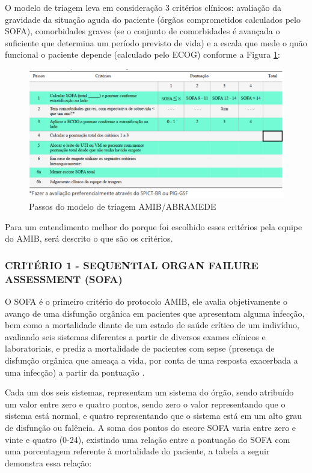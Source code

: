 \documentclass[12pt]{article}
\begin{document}
O modelo de triagem leva em consideração 3 critérios clínicos: avaliação da gravidade da situação aguda do paciente (órgãos comprometidos calculados pelo SOFA), comorbidades graves (se o conjunto de comorbidades é avançada o suficiente que determina um período previsto de vida) e a escala que mede o quão funcional o paciente depende (calculado pelo ECOG) conforme a Figura \ref{Passos-modelo-triagem-AMIB-ABRAMEDE}:

\begin{figure}[H]
    \centering
    \includegraphics[scale=0.5]{img/Tabela de pontuacoes e criterios.png}
    \centering
    \caption{Passos do modelo de triagem AMIB/ABRAMEDE \cite{kretzer2020recomendaccoes}}
    \label{Passos-modelo-triagem-AMIB-ABRAMEDE}
\end{figure}

Para um entendimento melhor do porque foi escolhido esses critérios pela equipe do AMIB, será descrito o que são os critérios.

\subsubsection{CRITÉRIO 1 - SEQUENTIAL ORGAN FAILURE ASSESSMENT (SOFA)}

O SOFA é o primeiro critério do protocolo AMIB, ele avalia objetivamente o avanço de uma disfunção orgânica em pacientes que apresentam alguma infecção, bem como a mortalidade diante de um estado de saúde crítico de um indivíduo, avaliando seis sistemas diferentes a partir de diversos exames clínicos e laboratoriais, e prediz a mortalidade de pacientes com sepse (presença de disfunção orgânica que ameaça a vida, por conta de uma resposta exacerbada a uma infecção) a partir da pontuação \cite{lambden2019sofa}.

Cada um dos seis sistemas, representam um sistema do órgão, sendo atribuído um valor entre zero e quatro pontos, sendo zero o valor representando que o sistema está normal, e quatro representando que o sistema está em um alto grau de disfunção ou falência. A soma dos pontos do escore SOFA varia entre zero e vinte e quatro (0-24), existindo uma relação entre a pontuação do SOFA com uma porcentagem referente à mortalidade do paciente, a tabela a seguir demonstra essa relação:
\end{document}
